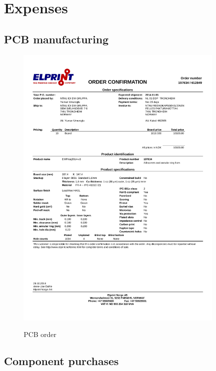 \documentclass[../main/report.tex]{subfiles}
\begin{document}
\chapter{Expenses}

\section{PCB manufacturing}

\begin{figure}[H]
    \centering
    \includegraphics[width=0.9\textwidth]{../appendix/assets/pcb-purchase.pdf}
    \label{fig:pcb-order}
    \caption{PCB order}
\end{figure}

\section{Component purchases}
\end{document}

